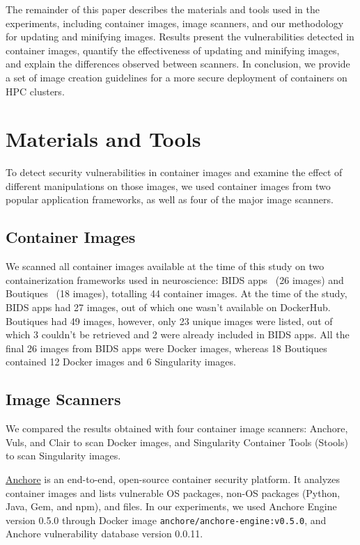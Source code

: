 \documentclass[a4paper,num-refs]{oup-contemporary}
\begin{document}
The remainder of this paper 
describes the materials and tools used in the
experiments, including container images, image scanners, and our methodology for updating and minifying images.
Results present the vulnerabilities detected in container
images, quantify the effectiveness of updating and minifying images, and
explain the differences observed between scanners. In conclusion, we
provide a set of image creation guidelines for a more secure deployment of
containers on HPC clusters.

\section{Materials and Tools}

To detect security vulnerabilities
in container images and examine the effect of different
manipulations on those images, we used container
images from two popular application frameworks, as well as
four of the major image scanners.

\subsection{Container Images}

We scanned all container images available at the time of this study on two containerization frameworks
used in neuroscience: BIDS
apps~\cite{gorgolewski2017bids} (26 images) and Boutiques~\cite{glatard2018boutiques} (18 images),
totalling
44 container images. At the time of the study, BIDS apps had 27 images,
out of which one wasn't available on DockerHub. Boutiques had 49 images,
however, only 23 unique images were listed, out of which 3 couldn't be retrieved and 2
were already included in BIDS apps. All the final 26 images
from BIDS apps were Docker images, whereas 18 Boutiques contained 12 Docker images
and 6 Singularity images.

\subsection{Image Scanners}

We compared the results obtained with four container image scanners: Anchore, Vuls, and
Clair to scan Docker images, and Singularity Container Tools
(Stools) to scan Singularity images. 

\href{https://github.com/anchore/anchore-engine}{Anchore} is an end-to-end, open-source container security platform. It
analyzes container images and lists vulnerable OS
packages, non-OS packages (Python, Java, Gem, and npm), and files.
In our experiments, we used Anchore Engine version 0.5.0 through Docker image \texttt{anchore/anchore-engine:v0.5.0}, and
Anchore vulnerability database version 0.0.11.
\end{document}
